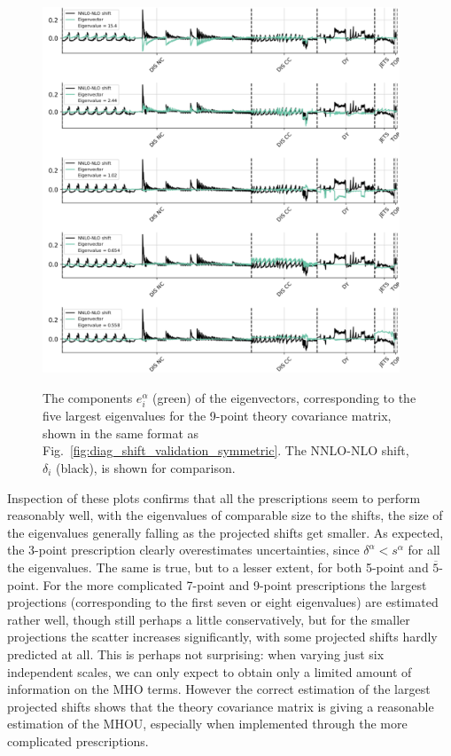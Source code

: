 \begin{figure}[ht!]
  \begin{center}
    \includegraphics[width=0.95\textwidth]{mhous/plots/eigenvector_plot_10.pdf}\\
    \caption{\small The components  $e^\alpha_i$ (green) of the eigenvectors, corresponding
      to the five largest eigenvalues for the 9-point theory covariance matrix, shown in the same format as Fig.~\ref{fig:diag_shift_validation_symmetric}. The NNLO-NLO shift, $\delta_i$ (black), is shown for comparison.
    \label{fig:evecs1} }
  \end{center}
\end{figure}


Inspection of these plots confirms that all the prescriptions seem to 
perform reasonably well, with the
eigenvalues of comparable size to the shifts, the size of the eigenvalues generally falling as the projected shifts get smaller. As expected, the 3-point prescription clearly overestimates uncertainties, since $\delta^\alpha < s^\alpha$ for all the eigenvalues. The same is true, but to a lesser extent, for both 5-point and $\overline{5}$-point. For the more complicated 7-point and 9-point 
prescriptions the largest projections (corresponding to the first seven or eight eigenvalues) are estimated rather well, though still perhaps a little conservatively, but for the smaller projections the scatter increases significantly, with some projected shifts hardly predicted at all. This is perhaps not surprising: when varying just six independent scales, we can only expect to obtain only a limited amount of information on the MHO terms. However the correct estimation of the largest projected shifts shows that the theory covariance matrix is giving a reasonable estimation of the MHOU, especially when implemented through the more complicated prescriptions.


